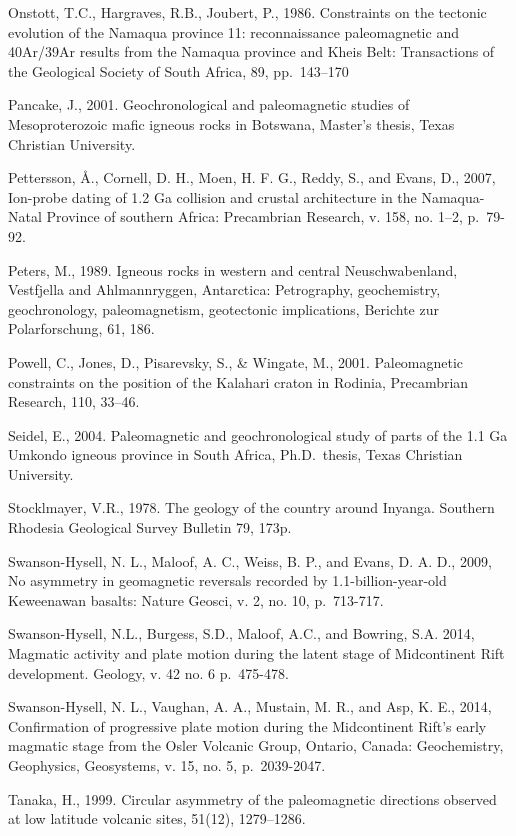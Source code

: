 \documentclass{article}
\begin{document}
Onstott, T.C., Hargraves, R.B., Joubert, P., 1986. Constraints on the
tectonic evolution of the Namaqua province 11: reconnaissance
paleomagnetic and 40Ar/39Ar results from the Namaqua province and Kheis
Belt: Transactions of the Geological Society of South Africa, 89,
pp.~143--170

Pancake, J., 2001. Geochronological and paleomagnetic studies of
Mesoproterozoic mafic igneous rocks in Botswana, Master's thesis, Texas
Christian University.

Pettersson, Å., Cornell, D. H., Moen, H. F. G., Reddy, S., and Evans,
D., 2007, Ion-probe dating of 1.2 Ga collision and crustal architecture
in the Namaqua-Natal Province of southern Africa: Precambrian Research,
v. 158, no. 1--2, p.~79-92.

Peters, M., 1989. Igneous rocks in western and central Neuschwabenland,
Vestfjella and Ahlmannryggen, Antarctica: Petrography, geochemistry,
geochronology, paleomagnetism, geotectonic implications, Berichte zur
Polarforschung, 61, 186.

Powell, C., Jones, D., Pisarevsky, S., \& Wingate, M., 2001.
Paleomagnetic constraints on the position of the Kalahari craton in
Rodinia, Precambrian Research, 110, 33--46.

Seidel, E., 2004. Paleomagnetic and geochronological study of parts of
the 1.1 Ga Umkondo igneous province in South Africa, Ph.D.~thesis, Texas
Christian University.

Stocklmayer, V.R., 1978. The geology of the country around Inyanga.
Southern Rhodesia Geological Survey Bulletin 79, 173p.

Swanson-Hysell, N. L., Maloof, A. C., Weiss, B. P., and Evans, D. A. D.,
2009, No asymmetry in geomagnetic reversals recorded by
1.1-billion-year-old Keweenawan basalts: Nature Geosci, v. 2, no. 10,
p.~713-717.

Swanson-Hysell, N.L., Burgess, S.D., Maloof, A.C., and Bowring, S.A.
2014, Magmatic activity and plate motion during the latent stage of
Midcontinent Rift development. Geology, v. 42 no. 6 p.~475-478.

Swanson-Hysell, N. L., Vaughan, A. A., Mustain, M. R., and Asp, K. E.,
2014, Confirmation of progressive plate motion during the Midcontinent
Rift's early magmatic stage from the Osler Volcanic Group, Ontario,
Canada: Geochemistry, Geophysics, Geosystems, v. 15, no. 5,
p.~2039-2047.

Tanaka, H., 1999. Circular asymmetry of the paleomagnetic directions
observed at low latitude volcanic sites, 51(12), 1279--1286.
\end{document}
